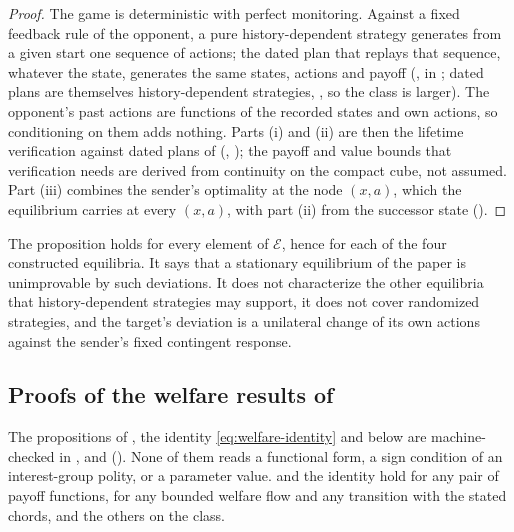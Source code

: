 \begin{proof}
The game is deterministic with perfect monitoring. Against a fixed feedback
rule of the opponent, a pure history-dependent strategy generates from a given
start one sequence of actions; the dated plan that replays that sequence,
whatever the state, generates the same states, actions and payoff
(, in
; dated plans are themselves
history-dependent strategies, , so the class
is larger). The opponent's past actions are functions of the recorded states
and own actions, so conditioning on them adds nothing. Parts (i) and (ii) are
then the lifetime verification against dated plans of
(,
); the payoff and value
bounds that verification needs are derived from continuity on the compact
cube, not assumed. Part (iii) combines the sender's optimality at the node
$(x,a)$, which the equilibrium carries at every $(x,a)$, with part (ii) from
the successor state
().
\end{proof}

The proposition holds for every element of $\mathcal E$, hence for each of the
four constructed equilibria. It says that a stationary equilibrium of the paper
is unimprovable by such deviations. It does not characterize the other
equilibria that history-dependent strategies may support, it does not cover
randomized strategies, and the target's deviation is a unilateral change of
its own actions against the sender's fixed contingent response.

\subsection{Proofs of the welfare results of }
\label{app:proofs:welfare}

The propositions of , the identity \eqref{eq:welfare-identity} and
 below are machine-checked in ,
 and
 (). None of
them reads a functional form, a sign condition of an interest-group polity, or a
parameter value.  and the identity hold for any pair of
payoff functions,  for any bounded welfare flow
and any transition with the stated chords, and the others on the class.

